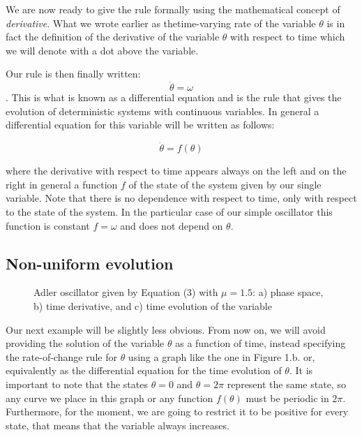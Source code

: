 \documentclass{article}
\begin{document}
We are now ready to give the rule formally using the mathematical concept of {\em derivative}. 
What we wrote earlier as thetime-varying rate of the variable $\theta$ is in fact the definition of the derivative of the variable $\theta$ with respect to time which we will denote with a dot above the variable. 

Our rule is then finally written: 
\begin{equation}
\dot\theta = \omega    
\end{equation}
. 
This is what is known as a differential equation and is the rule that gives the evolution of deterministic systems with continuous variables. 
In general a differential equation for this variable will be written as follows:

\begin{equation}
\dot\theta = f(\theta)    
\end{equation}

where the derivative with respect to time appears always on the left and on the right in general a function $f$ of the state of the system given by our single variable. 
Note that there is no dependence with respect to time, only with respect to the state of the system. 
In the particular case of our simple oscillator this function is constant $f=\omega$ and does not depend on $\theta$. 


\subsection{Non-uniform evolution}

\begin{figure}[h]
    \centering
    \caption{Adler oscillator given by Equation (3) with $\mu=1.5$: a) phase space, b) time derivative, and c) time evolution of the variable} 
    \label{fig_adler1}
\end{figure}

Our next example will be slightly less obvious. 
From now on, we will avoid providing the solution of the variable $\theta$ as a function of time, instead specifying the rate-of-change rule for $\theta$ using a graph like the one in Figure 1.b. or, equivalently as the differential equation for the time evolution of $\theta$.
It is important to note that the states $\theta=0$ and $\theta=2\pi$ represent the same state, so any curve we place in this graph or any function $f(\theta)$ must be periodic in $2\pi$. 
Furthermore, for the moment, we are going to restrict it to be positive for every state, that means that the variable always increases. 
\end{document}
